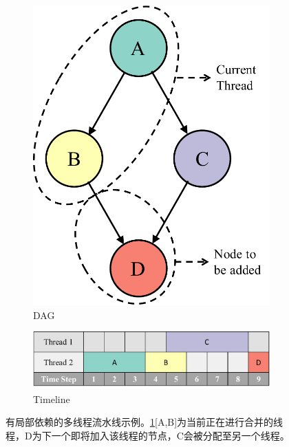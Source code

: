 \begin{figure}[htp]
    \centering
    \begin{subfigure}{0.25\textwidth}
    \centering
    \includegraphics[width=\textwidth]{figure/ex_dep.pdf}
    \caption{DAG}
    \label{subfig:dag}
    \end{subfigure}
    \begin{subfigure}{0.7\textwidth}
    \centering
    \vspace{60pt}
    \includegraphics[width=\textwidth]{figure/ex_dep_timeline.pdf}
    \caption{Timeline}
    \label{subfig:timeline}
    \end{subfigure}
    \caption[有局部依赖的多线程流水线示例]{有局部依赖的多线程流水线示例。\ref{subfig:dag}[A,B]为当前正在进行合并的线程，D为下一个即将加入该线程的节点，C会被分配至另一个线程。}
    \label{fig:ex_pipeline}
\end{figure}


